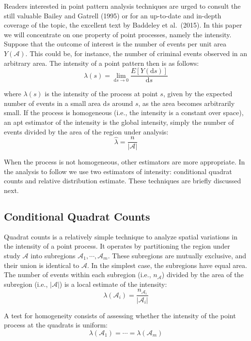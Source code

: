\documentclass[smallextended]{svjour3}       %
\begin{document}
Readers interested in point pattern analysis techniques are urged to
consult the still valuable Bailey and Gatrell (1995) or for an
up-to-date and in-depth coverage of the topic, the excellent text by
Baddeley et al.~(2015). In this paper we will concentrate on one
property of point processes, namely the intensity. Suppose that the
outcome of interest is the number of events per unit area
\(Y(\mathcal{A})\). This could be, for instance, the number of criminal
events observed in an arbitrary area. The intensity of a point pattern
then is as follows: \[
\lambda(s)=\lim_{\text{d}s \to 0}\frac{E[Y(\text{d}s)]}{\text{d}s}
\]

where \(\lambda(s)\) is the intensity of the process at point \(s\),
given by the expected number of events in a small area \(\text{d}s\)
around \(s\), as the area becomes arbitrarily small. If the process is
homogeneous (i.e., the intensity is a constant over space), an apt
estimator of the intensity is the global intensity, simply the number of
events divided by the area of the region under analysis: \[
\hat{\lambda} = \frac{n}{|\mathcal{A}|}
\]

When the process is not homogeneous, other estimators are more
appropriate. In the analysis to follow we use two estimators of
intensity: conditional quadrat counts and relative distribution
estimate. These techniques are briefly discussed next.

\hypertarget{conditional-quadrat-counts}{%
\subsection{Conditional Quadrat
Counts}\label{conditional-quadrat-counts}}

Quadrat counts is a relatively simple technique to analyze spatial
variations in the intensity of a point process. It operates by
partitioning the region under study \(\mathcal{A}\) into subregions
\(\mathcal{A}_1,\cdots,\mathcal{A}_m\). These subregions are mutually
exclusive, and their union is identical to \(\mathcal{A}\). In the
simplest case, the subregions have equal area. The number of events
within each subregion (i.e., \(n_{\mathcal{A}}\)) divided by the area of
the subregion (i.e., \(|\mathcal{A}|\)) is a local estimate of the
intensity: \[
\lambda(\mathcal{A}_i)=\frac{n_{\mathcal{A}_i}}{|\mathcal{A}_i|}
\]

A test for homogeneity consists of assessing whether the intensity of
the point process at the quadrats is uniform: \[
\lambda(\mathcal{A}_1)=\cdots=\lambda(\mathcal{A}_m)
\]
\end{document}
